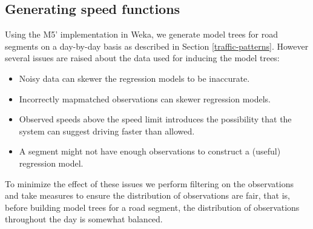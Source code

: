 \subsection{Generating speed functions}
Using the M5' implementation in Weka, we generate model trees for road segments on a day-by-day basis as described in Section \ref{traffic-patterns}. However several issues are raised about the data used for inducing the model trees:
\begin{itemize}
\item Noisy data can skewer the regression models to be inaccurate.
\item Incorrectly mapmatched observations can skewer regression models.
\item Observed speeds above the speed limit introduces the possibility that the system can suggest driving faster than allowed.
\item A segment might not have enough observations to construct a (useful) regression model.
\end{itemize}
To minimize the effect of these issues we perform filtering on the observations and take measures to ensure the distribution of observations are fair, that is, before building model trees for a road segment, the distribution of observations throughout the day is somewhat balanced.
